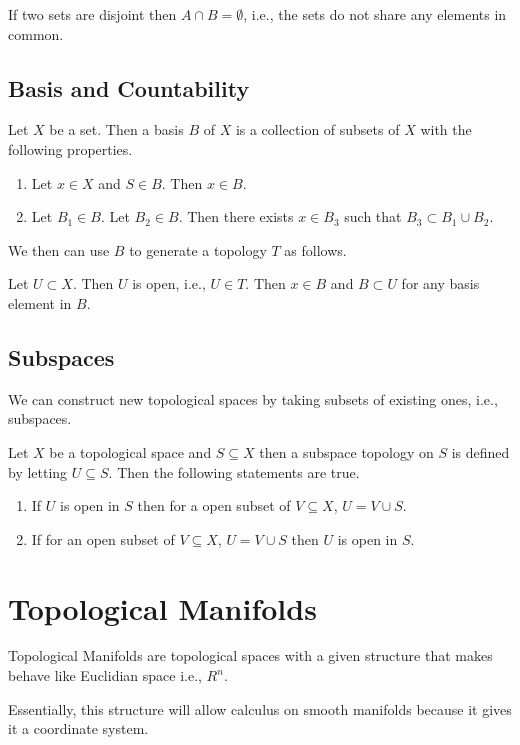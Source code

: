 \documentclass{article}
\begin{document}
If two sets are disjoint then $ A \cap B = \emptyset $, i.e., the sets do not share any elements in common.
\subsection{Basis and Countability}

Let $ X $ be a set. Then a basis $ B $ of $ X $ is a collection of subsets of $ X $ with the following
properties.

\begin{enumerate}
\item Let $ x \in X $ and $ S \in B $. Then $ x \in B $.
\item Let $ B_{1} \in B $. Let $ B_{2} \in B $. Then there exists  $ x \in B_{3} $ such that $ B_{3} \subset B_{1} \cup B_{2} $.
\end{enumerate}

We then can use $ B $ to generate a topology $ T $ as follows.

Let $ U \subset X $. Then $ U $ is open, i.e., $ U \in T $. Then  $ x \in B $ and $ B \subset U $ for any basis element in $ B $.

\subsection{Subspaces}

We can construct new topological spaces by taking subsets of existing ones, i.e., subspaces.

Let $ X $ be a topological space and $ S \subseteq X $ then a subspace topology on $ S $ is defined
by letting  $ U \subseteq  S $. Then the following statements are true.

\begin{enumerate}
\item If $ U $ is open in $ S $ then for a open subset of $ V \subseteq X $, $ U =  V \cup  S $.
\item If for an open subset of $ V \subseteq X $, $ U =  V \cup  S $ then  $ U $ is open in $ S $.
\end{enumerate}

\section{Topological Manifolds}

Topological Manifolds are topological spaces with a given structure that makes behave like Euclidian space i.e., $ R^n $.

Essentially, this structure will allow calculus on smooth manifolds because it gives it a coordinate system.
\end{document}
